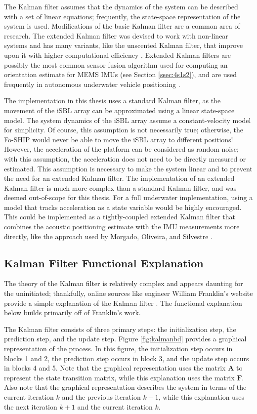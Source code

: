 \documentclass[11pt]{ucthesisCP}
\begin{document}
The Kalman filter assumes that the dynamics of the system can be described with a set of linear equations; frequently, the state-space representation of the system is used. Modifications of the basic Kalman filter are a common area of research. The extended Kalman filter was devised to work with non-linear systems and has many variants, like the unscented Kalman filter, that improve upon it with higher computational efficiency \cite{kfsimply}. Extended Kalman filters are possibly the most common sensor fusion algorithm used for computing an orientation estimate for MEMS IMUs \cite{madgwick} (see Section \ref{ssec:4s1s2}), and are used frequently in autonomous underwater vehicle positioning \cite{tightekf} \cite{iusblukf}. 

The implementation in this thesis uses a standard Kalman filter, as the movement of the iSBL array can be approximated using a linear state-space model. The system dynamics of the iSBL array assume a constant-velocity model for simplicity. Of course, this assumption is not necessarily true; otherwise, the Fo-SHIP would never be able to move the iSBL array to different positions! However, the acceleration of the platform can be considered as random noise; with this assumption, the acceleration does not need to be directly measured or estimated. This assumption is necessary to make the system linear and to prevent the need for an extended Kalman filter. The implementation of an extended Kalman filter is much more complex than a standard Kalman filter, and was deemed out-of-scope for this thesis. For a full underwater implementation, using a model that tracks acceleration as a state variable would be highly encouraged. This could be implemented as a tightly-coupled extended Kalman filter that combines the acoustic positioning estimate with the IMU measurements more directly, like the approach used by Morgado, Oliveira, and Silvestre \cite{tightekf}.

\subsection{Kalman Filter Functional Explanation} \label{ssec:5s1s2}
The theory of the Kalman filter is relatively complex and appears daunting for the uninitiated; thankfully, online sources like engineer William Franklin’s website provide a simple explanation of the Kalman filter \cite{kfsimply}. The functional explanation below builds primarily off of Franklin’s work.

The Kalman filter consists of three primary steps: the initialization step, the prediction step, and the update step. Figure \ref{fig:kalmanbd} provides a graphical representation of the process. In this figure, the initialization step occurs in blocks 1 and 2, the prediction step occurs in block 3, and the update step occurs in blocks 4 and 5. Note that the graphical representation uses the matrix \(\mathbf{A}\) to represent the state transition matrix, while this explanation uses the matrix \(\mathbf{F}\). Also note that the graphical representation describes the system in terms of the current iteration \(k\) and the previous iteration \(k-1\), while this explanation uses the next iteration \(k+1\) and the current iteration \(k\).
\end{document}
